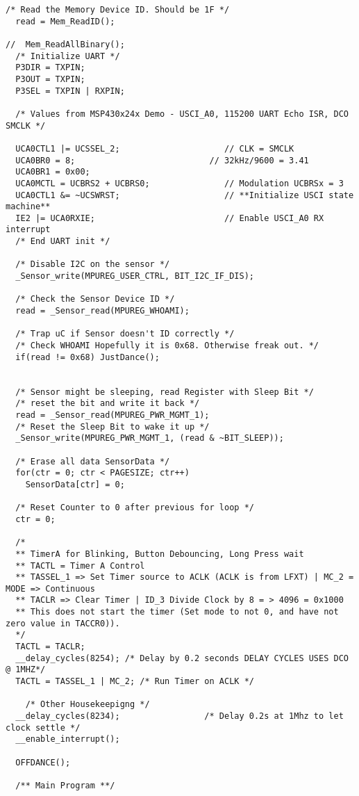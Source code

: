 \begin{lstlisting}[caption=Main.c,label=Code4]
  /* Read the Memory Device ID. Should be 1F */
  read = Mem_ReadID();

//  Mem_ReadAllBinary();
  /* Initialize UART */
  P3DIR = TXPIN;
  P3OUT = TXPIN;
  P3SEL = TXPIN | RXPIN;

  /* Values from MSP430x24x Demo - USCI_A0, 115200 UART Echo ISR, DCO SMCLK */
  
  UCA0CTL1 |= UCSSEL_2;                     // CLK = SMCLK
  UCA0BR0 = 8;                           // 32kHz/9600 = 3.41
  UCA0BR1 = 0x00;
  UCA0MCTL = UCBRS2 + UCBRS0;               // Modulation UCBRSx = 3
  UCA0CTL1 &= ~UCSWRST;                     // **Initialize USCI state machine**
  IE2 |= UCA0RXIE;                          // Enable USCI_A0 RX interrupt
  /* End UART init */

  /* Disable I2C on the sensor */
  _Sensor_write(MPUREG_USER_CTRL, BIT_I2C_IF_DIS);
  
  /* Check the Sensor Device ID */
  read = _Sensor_read(MPUREG_WHOAMI);

  /* Trap uC if Sensor doesn't ID correctly */
  /* Check WHOAMI Hopefully it is 0x68. Otherwise freak out. */
  if(read != 0x68) JustDance();                    

 
  /* Sensor might be sleeping, read Register with Sleep Bit */
  /* reset the bit and write it back */
  read = _Sensor_read(MPUREG_PWR_MGMT_1);
  /* Reset the Sleep Bit to wake it up */
  _Sensor_write(MPUREG_PWR_MGMT_1, (read & ~BIT_SLEEP));
  
  /* Erase all data SensorData */
  for(ctr = 0; ctr < PAGESIZE; ctr++)
    SensorData[ctr] = 0;

  /* Reset Counter to 0 after previous for loop */
  ctr = 0;
  
  /* 
  ** TimerA for Blinking, Button Debouncing, Long Press wait 
  ** TACTL = Timer A Control
  ** TASSEL_1 => Set Timer source to ACLK (ACLK is from LFXT) | MC_2 = MODE => Continuous
  ** TACLR => Clear Timer | ID_3 Divide Clock by 8 = > 4096 = 0x1000
  ** This does not start the timer (Set mode to not 0, and have not zero value in TACCR0)).
  */
  TACTL = TACLR;
  __delay_cycles(8254); /* Delay by 0.2 seconds DELAY CYCLES USES DCO @ 1MHZ*/
  TACTL = TASSEL_1 | MC_2; /* Run Timer on ACLK */

    /* Other Housekeepigng */
  __delay_cycles(8234);                 /* Delay 0.2s at 1Mhz to let clock settle */
  __enable_interrupt();

  OFFDANCE();

  /** Main Program **/
  

\end{lstlisting}
